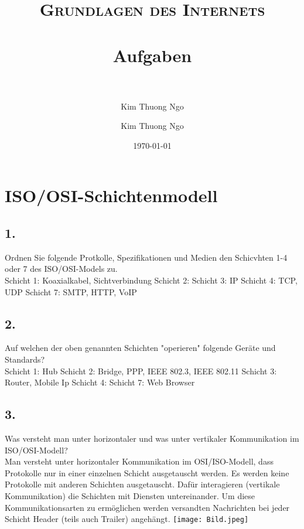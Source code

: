 \documentclass[paper=a4, fontsize=11pt]{scrartcl}
\author{Kim Thuong Ngo}
\title{	
\normalfont \normalsize 
\textsc{Grundlagen des Internets} \\ [25pt] 
\horrule{0.5pt} \\[0.4cm] 
\huge Aufgaben \\ 
\horrule{2pt} \\[0.5cm] 
}
\author{Kim Thuong Ngo}
\date{\normalsize\today}
\numberwithin{equation}{section}
\numberwithin{figure}{section}
\numberwithin{table}{section}
\begin{document}
\maketitle 

\newpage

\tableofcontents

\newpage


\section{ISO/OSI-Schichtenmodell}
\subsection{1.}
Ordnen Sie folgende Protkolle, Spezifikationen und Medien den Schicvhten 1-4 oder 7 des ISO/OSI-Models zu. \\
Schicht 1: Koaxialkabel, Sichtverbindung\newline
Schicht 2:\newline
Schicht 3: IP\newline
Schicht 4: TCP, UDP\newline
Schicht 7: SMTP, HTTP, VoIP\newline

\subsection{2.}
Auf welchen der oben genannten Schichten "operieren" folgende Geräte und Standards? \\
Schicht 1: Hub\newline
Schicht 2: Bridge, PPP, IEEE 802.3, IEEE 802.11\newline
Schicht 3: Router, Mobile Ip\newline
Schicht 4: \newline
Schicht 7: Web Browser\newline

\subsection{3.}
Was versteht man unter horizontaler und was unter vertikaler Kommunikation im ISO/OSI-Modell? \\
Man versteht unter horizontaler Kommunikation im OSI/ISO-Modell, dass Protokolle nur in einer einzelnen Schicht ausgetauscht werden. Es werden keine Protokolle mit anderen Schichten ausgetauscht. Dafür interagieren (vertikale Kommunikation) die Schichten mit Diensten untereinander. Um diese Kommunikationsarten zu ermöglichen werden versandten Nachrichten bei jeder Schicht Header (teils auch Trailer) angehängt.\newline
\texttt{[image: Bild.jpeg]}
\end{document}
